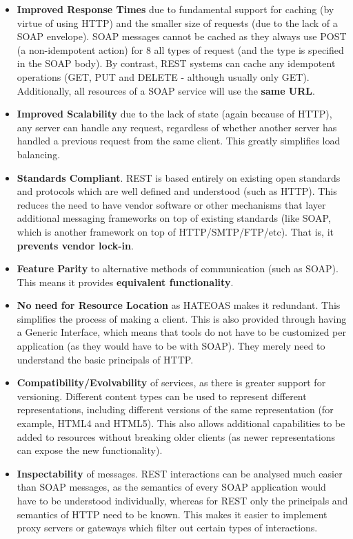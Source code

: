 \documentclass{article}
\begin{document}
\begin{itemize}
    \item \textbf{Improved Response Times} due to fundamental support for caching (by virtue of using HTTP) and the smaller size of requests (due to the lack of a SOAP envelope). SOAP messages cannot be cached as they always use POST (a non-idempotent action) for 8 all types of request (and the type is specified in the SOAP body). By contrast, REST systems can cache any idempotent operations (GET, PUT and DELETE - although usually only GET). Additionally, all resources of a SOAP service will use the \textbf{same URL}.
    \item \textbf{Improved Scalability} due to the lack of state (again because of HTTP), any server can handle any request, regardless of whether another server has handled a previous request from the same client. This greatly simplifies load balancing. 
    \item \textbf{Standards Compliant}. REST is based entirely on existing open standards and protocols which are well defined and understood (such as HTTP). This reduces the need to have vendor software or other mechanisms that layer additional messaging frameworks on top of existing standards (like SOAP, which is another framework on top of HTTP/SMTP/FTP/etc). That is, it \textbf{prevents vendor lock-in}.
    \item \textbf{Feature Parity} to alternative methods of communication (such as SOAP). This means it provides \textbf{equivalent functionality}.
    \item \textbf{No need for Resource Location} as HATEOAS makes it redundant. This simplifies the process of making a client. This is also provided through having a Generic Interface, which means that tools do not have to be customized per application (as they would have to be with SOAP). They merely need to understand the basic principals of HTTP. 
    \item \textbf{Compatibility/Evolvability} of services, as there is greater support for versioning. Different content types can be used to represent different representations, including different versions of the same representation (for example, HTML4 and HTML5). This also allows additional capabilities to be added to resources without breaking older clients (as newer representations can expose the new functionality).
    \item \textbf{Inspectability} of messages. REST interactions can be analysed much easier than SOAP messages, as the semantics of every SOAP application would have to be understood individually, whereas for REST only the principals and semantics of HTTP need to be known. This makes it easier to implement proxy servers or gateways which filter out certain types of interactions. 
\end{itemize}
\end{document}
